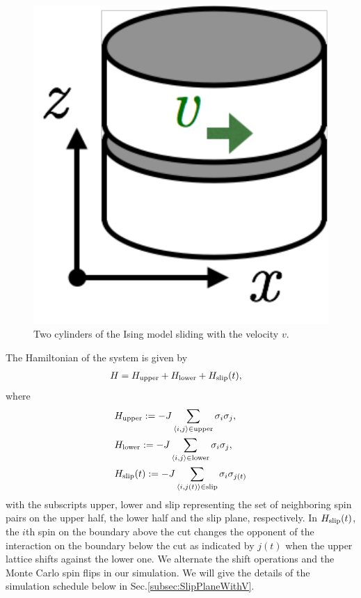 \begin{figure}[htbp]
	\centering
	\includegraphics[width=0.25\linewidth]{CutIsing.pdf}
	\caption{Two cylinders of the Ising model sliding with the velocity $v$.}
	\label{fig:CutIsing}
\end{figure}
The Hamiltonian of the system is given by
\begin{align}
&H=H_{\rm upper} + H_{\rm lower} + H_{\rm slip}(t),
\end{align}
where
\begin{align}
&H_{\rm upper}:=-J\sum_{\langle i,j\rangle\in\mathrm{upper}}\sigma_{i}\sigma_{j}\label{ham:upper}, \\
&H_{\rm lower}:=-J\sum_{\langle i,j\rangle\in\mathrm{lower}}\sigma_{i}\sigma_{j}\label{ham:lower}, \\
&H_{\rm slip}(t):=-J\sum_{\langle i,j(t)\rangle\in\mathrm{slip}}\sigma_{i}\sigma_{j(t)}\label{ham:slip}
\end{align}
with the subscripts upper, lower and slip representing the set of neighboring spin pairs on the upper half, the lower half and the slip plane, respectively. In $H_{\rm slip}(t)$, the $i$th spin on the boundary above the cut changes the opponent of the interaction on the boundary below the cut as indicated by $j(t)$ when the upper lattice shifts against the lower one. We alternate the shift operations and the Monte Carlo spin flips in our simulation. We will give the details of the simulation schedule below in Sec.\ref{subsec:SlipPlaneWithV}.

